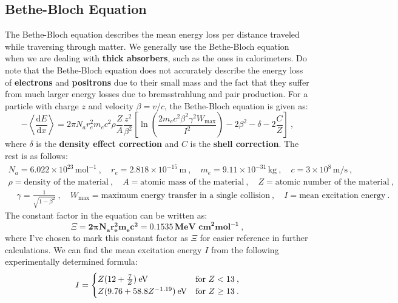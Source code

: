 \documentclass[10pt, titlepage, a4paper]{article}
\newcommand{\dd}{\mathrm{d}}
\numberwithin{equation}{section}
\begin{document}
\subsection{Bethe-Bloch Equation}
The Bethe-Bloch equation describes the mean energy loss per distance traveled while traversing through matter.
We generally use the Bethe-Bloch equation when we are dealing with \textbf{thick absorbers}, such as the ones in calorimeters.
Do note that the Bethe-Bloch equation does not accurately describe the energy loss of \textbf{electrons} and \textbf{positrons} 
due to their small mass and the fact that they suffer from much larger energy losses due to bremsstrahlung and pair production.
For a particle with charge $z$ and velocity $\beta = v/c$, the Bethe-Bloch equation is given as:
%
\begin{equation}
    -\left\langle \frac{\dd E}{\dd x} \right\rangle = 2\pi N_a r_e^2 m_e c^2 \rho \frac{Z}{A}\frac{z^2}{\beta^2}\left[\ln\left(\frac{2m_ec^2\beta^2\gamma^2W_{\text{max}}}{I^2}\right) - 2\beta^2 - \delta - 2\frac{C}{Z}\right]\>,
    \label{eq:bethe-bloch}
\end{equation}
%
where $\delta$ is the \textbf{density effect correction} and $C$ is the \textbf{shell correction}. The rest is as follows:
%
\begin{gather*}
    N_a = 6.022 \times 10^{23}\,\text{mol}^{-1}\>, \quad r_e = 2.818 \times 10^{-15}\,\text{m}\>, \quad m_e = 9.11 \times 10^{-31}\,\text{kg}\>, \quad c = 3 \times 10^8\,\text{m/s}\>, \nonumber \\
    \rho = \text{density of the material}\>, \quad A = \text{atomic mass of the material}\>, \quad Z = \text{atomic number of the material}\>, \\
    \quad \gamma = \frac{1}{\sqrt{1-\beta^2}}\>, \quad W_{\text{max}} = \text{maximum energy transfer in a single collision}\>, \quad I = \text{mean excitation energy}\>. \nonumber
\end{gather*}
%
The constant factor in the equation can be written as:
%
\begin{equation}
    \Xi = \bm{2\pi N_a r_e^2 m_e c^2 = 0.1535\,\textbf{MeV cm}^2\textbf{mol}^{-1}}\>,
    \label{eq:bb-constant}
\end{equation}
%
where I've chosen to mark this constant factor as $\Xi$ for easier reference in further calculations.
We can find the mean excitation energy $I$ from the following experimentally determined formula:
%
\begin{equation}
    I = \begin{cases}
        Z(12 + \frac{7}{Z})\>\rm{eV} & \text{for } Z < 13\>, \\
        Z(9.76 + 58.8Z^{-1.19})\>\rm{eV} & \text{for } Z \geq 13\>.
    \end{cases}
    \label{eq:I}
\end{equation}
\end{document}
